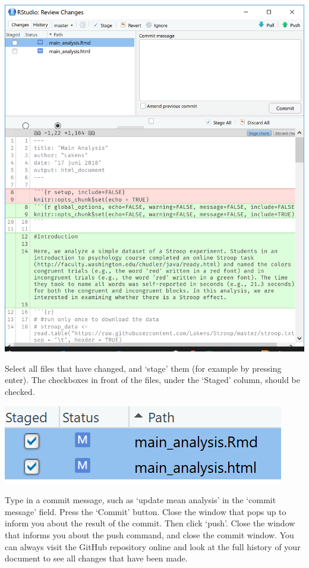\documentclass[
  oneside]{book}
\begin{document}
\begin{center}\includegraphics[width=1\linewidth]{images/045aa0f44f3615a30aeaac241042fa3a} \end{center}

Select all files that have changed, and `stage' them (for example by pressing
enter). The checkboxes in front of the files, under the `Staged' column, should
be checked.

\begin{center}\includegraphics[width=1\linewidth]{images/3d314b695f0d424b8792e4d179f6f4d3} \end{center}

Type in a commit message, such as `update mean analysis' in the `commit message'
field. Press the `Commit' button. Close the window that pops up to inform you
about the result of the commit. Then click `push'. Close the window that informs
you about the push command, and close the commit window. You can always visit
the GitHub repository online and look at the full history of your document to
see all changes that have been made.
\end{document}
